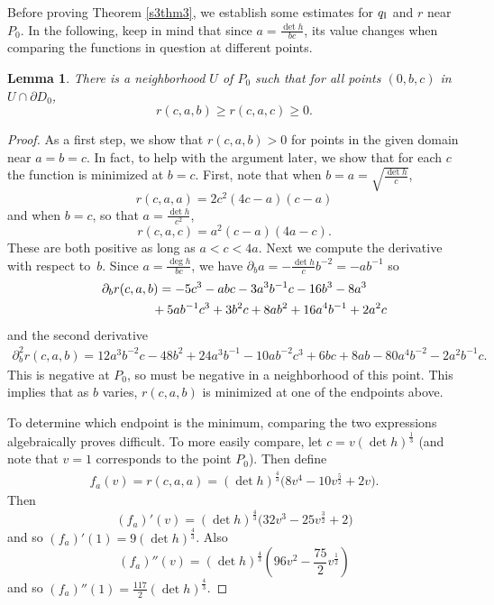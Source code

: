 \documentclass[10pt,a4paper]{amsart}
\numberwithin{equation}{section}
\newtheorem{Lemma}[Theorem]{Lemma}
\newcommand{\dvar}[1]{\partial_{#1}} %
\begin{document}
Before proving Theorem \ref{s3thm3}, we establish some estimates for $q_{\rm I}$ and $r$ near $P_0$.
In the following, keep in mind that since $a = \frac{\det h}{bc}$, its value changes when comparing the functions in question at different points.

\begin{Lemma} \label{s3abcequalrlemma}
There is a neighborhood $U$ of $P_0$ such that for all points $(0, b, c)$ in $U \cap \partial D_0$,
\[
r(c, a, b) \geq r(c, a, c) \geq 0.
\]
\end{Lemma}

\begin{proof}As a first step, we show that $r(c, a, b) > 0$ for points in the given domain near $a = b = c$. In fact, to help with the argument later, we show that for each $c$ the function is minimized at $b = c$. First, note that when $b = a = \sqrt{\frac{\det h}{c}}$,
\[
r(c, a, a) = 2c^2(4c - a)(c - a)
\]
and when $b = c$, so that $a = \frac{\det h}{c^2}$,
\[
r(c, a, c) = a^2(c - a)(4a - c). \]
These are both positive as long as $a < c < 4a$. Next we compute the derivative with respect to~$b$. Since $a = \frac{\deg h}{bc}$, we have $\dvar{b} a = - \frac{\det h}{c} b^{-2} = -a b^{-1}$ so
\begin{gather*}
\dvar{b} r(c, a, b) = -5c^3 - abc -3a^3 b^{-1} c - 16b^3 - 8a^3\\
\hphantom{\dvar{b} r(c, a, b) =}{} + 5ab^{-1} c^3 + 3b^2 c + 8ab^2 +16 a^4 b^{-1} + 2a^2c
\end{gather*}
and the second derivative
\begin{gather*}
\dvar{b}^2 r(c, a, b) = 12a^3 b^{-2} c - 48b^2 + 24 a^3 b^{-1} - 10ab^{-2}c^3
		 + 6bc + 8ab - 80 a^4b^{-2} - 2a^2 b^{-1} c.
\end{gather*}
This is negative at $P_0$, so must be negative in a neighborhood of this point. This implies that as $b$ varies, $r(c, a, b)$ is minimized at one of the endpoints above.

To determine which endpoint is the minimum, comparing the two expressions algebraically proves difficult. To more easily compare, let $c = v (\det h)^{\frac{1}{3}}$ (and note that $v = 1$ corresponds to the point $P_0$). Then define
\begin{gather*}
f_a(v) = r(c, a, a) = (\det h)^{\frac{4}{3}}\big(8v^4 - 10 v^{\frac{5}{2}} + 2 v\big).
\end{gather*}
Then
\[
(f_a)'(v) = (\det h)^{\frac{4}{3}}\big(32 v^3 - 25 v^{\frac{3}{2}} + 2\big)
\]
and so $(f_a)'(1) = 9 (\det h)^{\frac{4}{3}}$. Also
\[
(f_a)''(v) = (\det h)^{\frac{4}{3}} \left(96 v^2 - \frac{75}{2} v^{\frac{1}{2}} \right)
\]
and so $(f_a)''(1) = \frac{117}{2} (\det h)^{\frac{4}{3}}$.


\end{proof}
\end{document}
